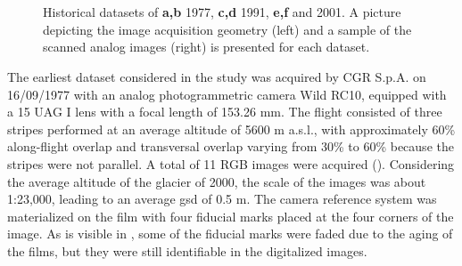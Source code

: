 \begin{figure}
{    } \\
     \quad
     \\
    \caption{Historical datasets of \textbf{a,b} 1977, \textbf{c,d} 1991, \textbf{e,f} and 2001. A picture depicting the image acquisition geometry (left) and a sample of the scanned analog images (right) is presented for each dataset.}
    \label{fig:2:datasets_historical}
\end{figure}

The earliest dataset considered in the study was acquired by CGR S.p.A. on 16/09/1977
with an analog photogrammetric camera Wild RC10, equipped with a 15 UAG I lens with a focal length of 153.26 mm. 
The flight consisted of three stripes performed at an average altitude of 5600 m a.s.l., with approximately 60\% along-flight overlap and transversal overlap varying from 30\% to 60\% because the stripes were not parallel. 
A total of 11 RGB images were acquired (). 
Considering the average altitude of the glacier of \SI{2000}{\masl}, the scale of the images was about 1:23,000, leading to an average \ac{gsd} of 0.5 m. 
The camera reference system was materialized on the film with four fiducial marks placed at the four corners of the image. 
As is visible in , some of the fiducial marks were faded due to the aging of the films, but they were still identifiable in the digitalized images.

